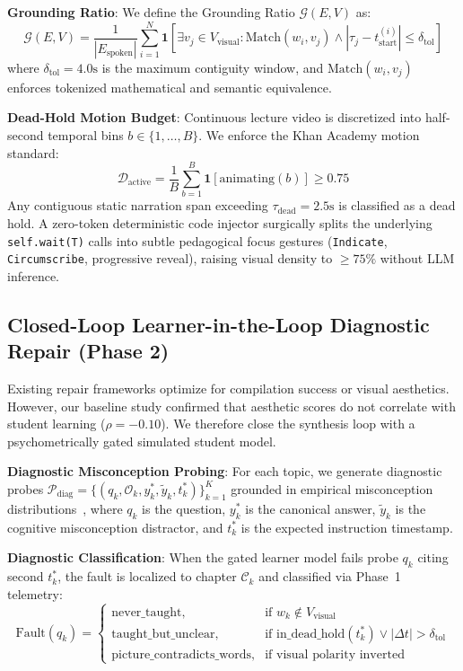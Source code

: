 \documentclass{article}
\begin{document}
\textbf{Grounding Ratio}: We define the Grounding Ratio $\mathcal{G}(E, V)$ as:
\begin{equation}
    \mathcal{G}(E, V) = \frac{1}{|E_{\text{spoken}}|} \sum_{i=1}^N \mathbf{1}\left[\exists v_j \in V_{\text{visual}} : \text{Match}(w_i, v_j) \land |\tau_j - t_{\text{start}}^{(i)}| \le \delta_{\text{tol}}\right]
\end{equation}
where $\delta_{\text{tol}} = 4.0\text{s}$ is the maximum contiguity window, and $\text{Match}(w_i, v_j)$ enforces tokenized mathematical and semantic equivalence.

\textbf{Dead-Hold Motion Budget}: Continuous lecture video is discretized into half-second temporal bins $b \in \{1, \dots, B\}$. We enforce the Khan Academy motion standard:
\begin{equation}
    \mathcal{D}_{\text{active}} = \frac{1}{B} \sum_{b=1}^B \mathbf{1}[\text{animating}(b)] \ge 0.75
\end{equation}
Any contiguous static narration span exceeding $\tau_{\text{dead}} = 2.5\text{s}$ is classified as a dead hold. A zero-token deterministic code injector surgically splits the underlying \texttt{self.wait(T)} calls into subtle pedagogical focus gestures (\texttt{Indicate}, \texttt{Circumscribe}, progressive reveal), raising visual density to $\ge 75\%$ without LLM inference.

\subsection{Closed-Loop Learner-in-the-Loop Diagnostic Repair (Phase 2)}
\label{subsec:learner_repair}
Existing repair frameworks optimize for compilation success or visual aesthetics. However, our baseline study confirmed that aesthetic scores do not correlate with student learning ($\rho = -0.10$). We therefore close the synthesis loop with a psychometrically gated simulated student model.

\textbf{Diagnostic Misconception Probing}: For each topic, we generate diagnostic probes $\mathcal{P}_{\text{diag}} = \{(q_k, \mathcal{O}_k, y_k^*, \tilde{y}_k, t_k^*)\}_{k=1}^K$ grounded in empirical misconception distributions~\cite{eedi2020diagnostic}, where $q_k$ is the question, $y_k^*$ is the canonical answer, $\tilde{y}_k$ is the cognitive misconception distractor, and $t_k^*$ is the expected instruction timestamp.

\textbf{Diagnostic Classification}: When the gated learner model fails probe $q_k$ citing second $t_k^*$, the fault is localized to chapter $\mathcal{C}_k$ and classified via Phase~1 telemetry:
\begin{equation}
    \text{Fault}(q_k) = \begin{cases}
    \text{never\_taught}, & \text{if } w_k \notin V_{\text{visual}} \\
    \text{taught\_but\_unclear}, & \text{if } \text{in\_dead\_hold}(t_k^*) \lor |\Delta t| > \delta_{\text{tol}} \\
    \text{picture\_contradicts\_words}, & \text{if visual polarity inverted}
    \end{cases}
\end{equation}
\end{document}
